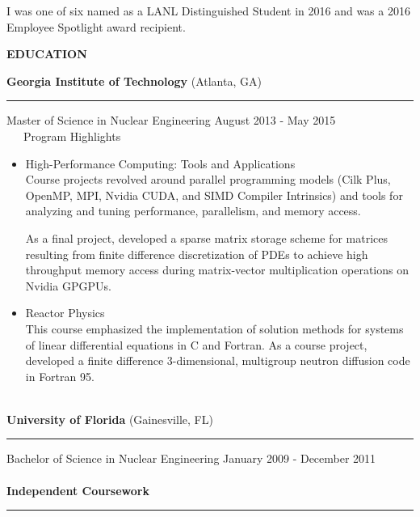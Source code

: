 \documentclass[legalpaper]{article}
\begin{document}
I was one of six named as a LANL Distinguished Student in 2016 and was a 2016 Employee Spotlight award recipient.

\begin{center}
  \begin{shaded}
    { \color{white} \textbf{EDUCATION}}
  \end{shaded}
\end{center}
\textbf{Georgia Institute of Technology} (Atlanta, GA)\hrule \vspace{1mm}

Master of Science in Nuclear Engineering \hfill August 2013 - May 2015\\
\vspace{\baselineskip} %
~~~Program Highlights
\begin{itemize}[topsep=0pt, before={\vspace*{-0.5\baselineskip}}]%
\item High-Performance Computing: Tools and Applications\\
  Course projects revolved around parallel programming models (Cilk Plus, OpenMP, MPI, Nvidia CUDA, and SIMD Compiler Intrinsics) and tools for analyzing and tuning performance, parallelism, and memory access.

  As a final project, developed a sparse matrix storage scheme for matrices resulting from finite difference discretization of PDEs to achieve high throughput memory access during matrix-vector multiplication operations on Nvidia GPGPUs.

\item Reactor Physics\\
  This course emphasized the implementation of solution methods for systems of linear differential equations in C and Fortran.
  As a course project, developed a finite difference 3-dimensional, multigroup neutron diffusion code in Fortran 95.
\end{itemize}
~\\
\textbf{University of Florida} (Gainesville, FL) \hrule \vspace{1mm}
Bachelor of Science in Nuclear Engineering \hfill January 2009 - December 2011\\
~\\
\textbf{Independent Coursework}\hrule \vspace{1mm}
\end{document}
